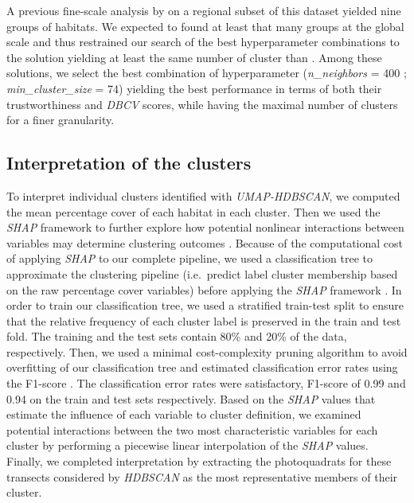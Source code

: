\begin{refsection}
A previous fine-scale analysis by \textcite{Cresswell_2017} on a
regional subset of this dataset yielded nine groups of habitats. We
expected to found at least that many groups at the global scale and thus
restrained our search of the best hyperparameter combinations to the
solution yielding at least the same number of cluster than
\textcite{Cresswell_2017}. Among these solutions, we select the best
combination of hyperparameter (\emph{n\_neighbors} = 400 ;
\emph{min\_cluster\_size} = 74) yielding the best performance in terms
of both their trustworthiness and \emph{DBCV} scores, while having the
maximal number of clusters for a finer granularity.

\hypertarget{interpretation-of-the-clusters}{%
\subsection{Interpretation of the
clusters}\label{interpretation-of-the-clusters}}

To interpret individual clusters identified with \emph{UMAP-HDBSCAN}, we
computed the mean percentage cover of each habitat in each cluster. Then
we used the \emph{SHAP} framework to further explore how potential
nonlinear interactions between variables may determine clustering
outcomes \autocite{Lundberg_2017}. Because of the computational cost of
applying \emph{SHAP} to our complete pipeline, we used a classification
tree \autocite{Breiman_1984} to approximate the clustering pipeline
(i.e.~predict label cluster membership based on the raw percentage cover
variables) before applying the \emph{SHAP} framework
\autocite{Lundberg_2017}. In order to train our classification tree, we
used a stratified train-test split to ensure that the relative frequency
of each cluster label is preserved in the train and test fold. The
training and the test sets contain 80\% and 20\% of the data,
respectively. Then, we used a minimal cost-complexity pruning algorithm
to avoid overfitting of our classification tree \autocite{Breiman_1984}
and estimated classification error rates using the F1-score
\autocite{vanRijsbergen_1979}. The classification error rates were
satisfactory, F1-score of 0.99 and 0.94 on the train and test sets
respectively. Based on the \emph{SHAP} values that estimate the
influence of each variable to cluster definition, we examined potential
interactions between the two most characteristic variables for each
cluster by performing a piecewise linear interpolation of the
\emph{SHAP} values. Finally, we completed interpretation by extracting
the photoquadrats for these transects considered by \emph{HDBSCAN} as
the most representative members of their cluster.


\end{refsection}

